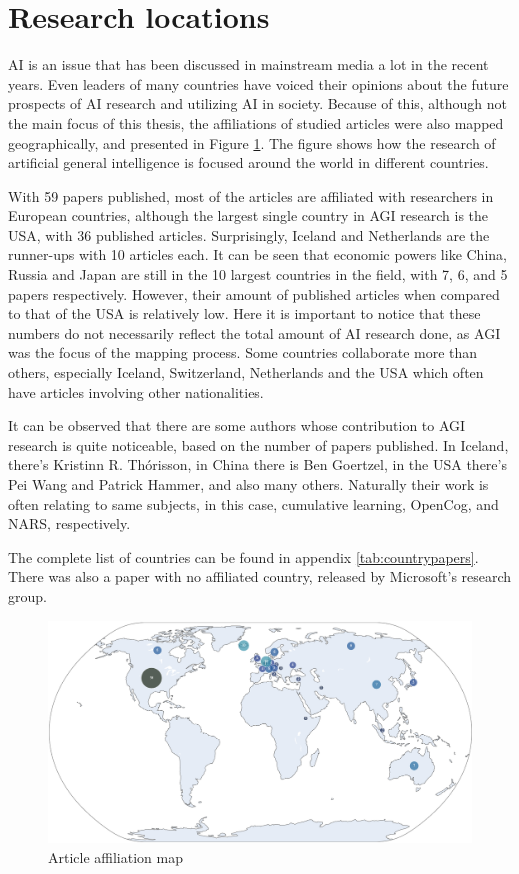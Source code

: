 \section{Research locations}

AI is an issue that has been discussed in mainstream media a lot in the recent
years. Even leaders of many countries have voiced their opinions about the
future prospects of AI research and utilizing AI in society. Because of this,
although not the main focus of this thesis, the affiliations of studied articles
were also mapped geographically, and presented in Figure \ref{fig:researchmap}.
The figure shows how the research of artificial general intelligence is focused
around the world in different countries. 

With 59 papers published, most of the articles are affiliated with researchers
in European countries, although the largest single country in AGI research is the
USA, with 36 published articles. Surprisingly, Iceland and Netherlands are the
runner-ups with 10 articles each. It can be seen that economic powers like
China, Russia and Japan are still in the 10 largest countries in the field, with
7, 6, and 5 papers respectively. However, their amount of published articles
when compared to that of the USA is relatively low. Here it is important to notice
that these numbers do not necessarily reflect the total amount of AI research
done, as AGI was the focus of the mapping process. Some countries
collaborate more than others, especially Iceland, Switzerland, Netherlands and the
USA which often have articles involving other nationalities.

It can be observed that there are some authors whose contribution to AGI
research is quite noticeable, based on the number of papers published. In
Iceland, there's Kristinn R. Th\'orisson, in China there is Ben Goertzel, in the
USA there's Pei Wang and Patrick Hammer, and also many others. Naturally their
work is often relating to same subjects, in this case, cumulative learning,
OpenCog, and NARS, respectively.

The complete list of countries can be found in appendix
\ref*{tab:countrypapers}. There was also a paper with no affiliated country,
released by Microsoft's research group.

\begin{figure}
  \includegraphics[scale=0.60]{material/data/research_map_delta_count.png}
  \caption{Article affiliation map}
  \label{fig:researchmap}
\end{figure}

